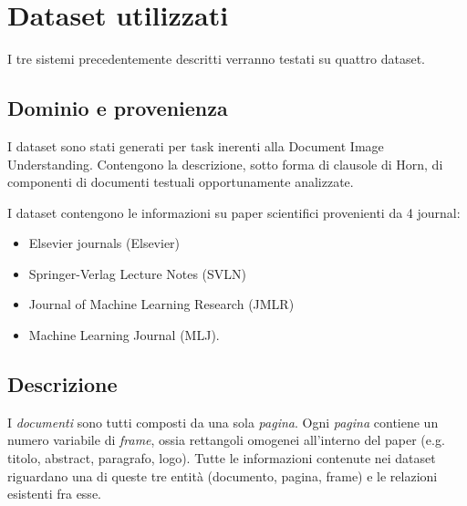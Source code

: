 \section{Dataset utilizzati}


I tre sistemi precedentemente descritti verranno testati su quattro dataset.

\subsection{Dominio e provenienza}
I dataset sono stati generati per task inerenti alla Document Image Understanding.
Contengono la descrizione, sotto forma di clausole di Horn, di componenti di documenti testuali opportunamente analizzate.

I dataset contengono le informazioni su paper scientifici provenienti da 4 journal:
\begin{itemize}
\item Elsevier journals (Elsevier)
\item Springer-Verlag Lecture Notes (SVLN)
\item Journal of Machine Learning Research (JMLR)
\item Machine Learning Journal (MLJ).
\end{itemize}


\subsection{Descrizione}
I \emph{documenti} sono tutti composti da una sola \emph{pagina}. Ogni \emph{pagina} contiene un numero variabile di \emph{frame}, ossia rettangoli omogenei all'interno del paper (e.g. titolo, abstract, paragrafo, logo).
Tutte le informazioni contenute nei dataset riguardano una di queste tre entità (documento, pagina, frame) e le relazioni esistenti fra esse.

